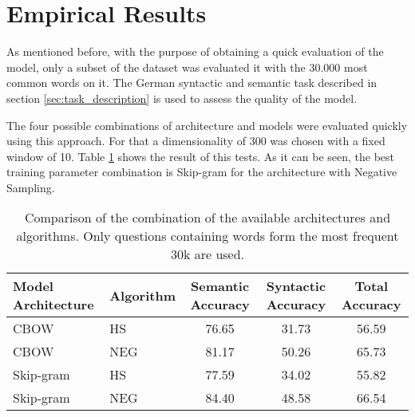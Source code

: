 \section{Empirical Results}
\label{sec:sub_empirical_results}

As mentioned before, with the purpose of obtaining  a quick evaluation of the
model, only a subset of the dataset was evaluated it with the 30.000 
most common words on it. The German syntactic and semantic task described in
section \ref{sec:task_description} is used  to assess the quality of the
model. 


The four possible combinations of architecture and models were evaluated
quickly using this approach. For that a dimensionality of 300 was chosen with
a fixed window of 10. Table \ref{tab:initial_w2v_comparison} shows the result
of this tests. As it can be seen, the best training parameter combination is
Skip-gram for the architecture with Negative Sampling.








\begin{table}[h]
\centering
\caption{Comparison of the combination of the available architectures and algorithms.
 Only questions containing words form the most  frequent 30k are used.} 
\label{tab:initial_w2v_comparison}


\begin{center}
\small

\begin{tabular}{|l|l|c|c|c|}
\hline
 Model Architecture  &   Algorithm  &  Semantic Accuracy  &  Syntactic Accuracy  &  Total Accuracy  \\
\hline
 CBOW               &  HS                   &              76.65  &               31.73  &           56.59  \\
 CBOW               &  NEG                  &              81.17  &               50.26  &           65.73  \\
 Skip-gram          &  HS                   &              77.59  &               34.02  &           55.82  \\
 Skip-gram          &  NEG                  &              84.40  &               48.58  &           66.54  \\
\hline
\end{tabular}
\end{center}

\end{table}


